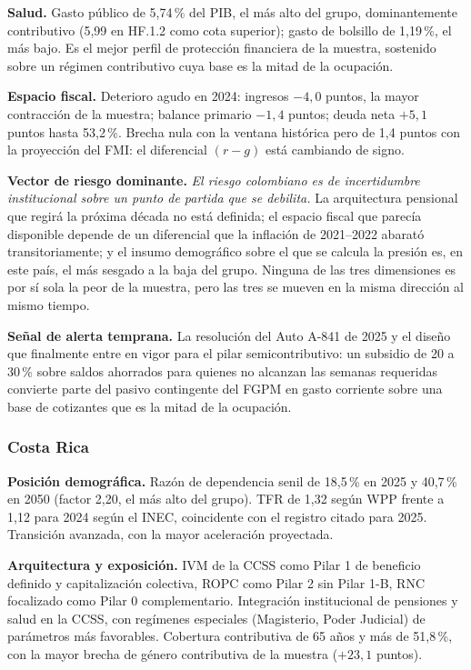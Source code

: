 \documentclass[12pt, letterpaper]{article}
\begin{document}
\textbf{Salud.} Gasto público de 5,74\,\% del PIB, el más alto del grupo,
dominantemente contributivo (5,99 en HF.1.2 como cota superior); gasto de bolsillo
de 1,19\,\%, el más bajo. Es el mejor perfil de protección financiera de la muestra,
sostenido sobre un régimen contributivo cuya base es la mitad de la ocupación.

\textbf{Espacio fiscal.} Deterioro agudo en 2024: ingresos $-4{,}0$ puntos, la mayor
contracción de la muestra; balance primario $-1{,}4$ puntos; deuda neta $+5{,}1$
puntos hasta 53,2\,\%. Brecha nula con la ventana histórica pero de 1,4 puntos con
la proyección del FMI: el diferencial $(r-g)$ está cambiando de signo.

\textbf{Vector de riesgo dominante.} \emph{El riesgo colombiano es de incertidumbre
institucional sobre un punto de partida que se debilita.} La arquitectura
pensional que regirá la próxima década no está definida; el espacio fiscal que
parecía disponible depende de un diferencial que la inflación de 2021--2022
abarató transitoriamente; y el insumo demográfico sobre el que se calcula la
presión es, en este país, el más sesgado a la baja del grupo. Ninguna de las tres
dimensiones es por sí sola la peor de la muestra, pero las tres se mueven en la
misma dirección al mismo tiempo.

\textbf{Señal de alerta temprana.} La resolución del Auto A-841 de 2025 y el
diseño que finalmente entre en vigor para el pilar semicontributivo: un subsidio
de 20 a 30\,\% sobre saldos ahorrados para quienes no alcanzan las semanas
requeridas convierte parte del pasivo contingente del FGPM en gasto corriente
sobre una base de cotizantes que es la mitad de la ocupación.

\subsubsection{Costa Rica}

\textbf{Posición demográfica.} Razón de dependencia senil de 18,5\,\% en 2025 y
40,7\,\% en 2050 (factor 2,20, el más alto del grupo). TFR de 1,32 según WPP frente
a 1,12 para 2024 según el INEC, coincidente con el registro citado para 2025.
Transición avanzada, con la mayor aceleración proyectada.

\textbf{Arquitectura y exposición.} IVM de la CCSS como Pilar 1 de beneficio
definido y capitalización colectiva, ROPC como Pilar 2 sin Pilar 1-B, RNC
focalizado como Pilar 0 complementario. Integración institucional de pensiones y
salud en la CCSS, con regímenes especiales (Magisterio, Poder Judicial) de
parámetros más favorables. Cobertura contributiva de 65 años y más de 51,8\,\%, con
la mayor brecha de género contributiva de la muestra ($+23{,}1$ puntos).
\end{document}
